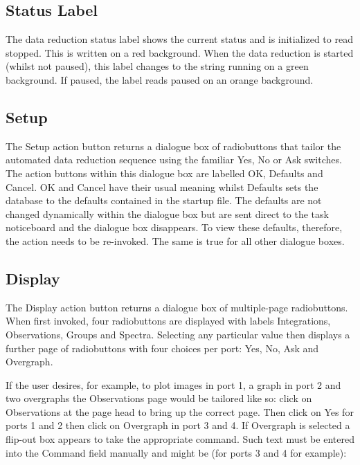 \documentclass[a4paper]{book}
\renewcommand{\_}{{\tt\char'137}}
\begin{document}
\subsection{Status Label}
The data reduction status label shows the current status and is initialized to read 
{\sc stopped}. This is written on a red background. When the data reduction is started (whilst not paused), this
label changes to the string {\sc running} on a green background. If paused, the label reads {\sc paused} on an
orange background. 

\subsection{Setup}
The {\sf Setup} action button returns a dialogue box of radiobuttons that tailor the automated data
reduction sequence using the familiar {\sf Yes}, {\sf No} or {\sf Ask} switches. The action buttons within this dialogue
box are labelled {\sf OK}, {\sf Defaults} and {\sf Cancel}.
{\sf OK} and {\sf Cancel} have their usual meaning whilst {\sf Defaults} sets the database to the defaults contained
in the startup file. The defaults are not changed dynamically within the dialogue box but
are sent direct to the task noticeboard and the dialogue box disappears. To view these defaults,
therefore, the action needs to be re-invoked. The same is true for all other dialogue boxes.

\subsection{Display}
The {\sf Display} action button returns a dialogue box of
multiple-page radiobuttons. When first invoked, four radiobuttons are displayed with labels
{\sf Integrations}, {\sf Observations}, {\sf Groups} and {\sf Spectra}. Selecting any particular
value then displays a further page of radiobuttons with four choices per port: {\sf Yes}, 
{\sf No}, {\sf Ask} and {\sf Overgraph}.

If the user desires, for example, to plot images in port 1, a graph in port 2 and two overgraphs the
{\sf Observations} page would be tailored like so: click on {\sf Observations} at the page head to 
bring up the correct page. Then click on {\sf Yes} for ports 1 and 2 then
click on {\sf Overgraph} in port 3 and 4. If {\sf Overgraph} is selected a flip-out box appears
to take the appropriate command. Such text must be entered into the {\sf Command} field
manually and might be (for ports 3 and 4 for example):
\end{document}
